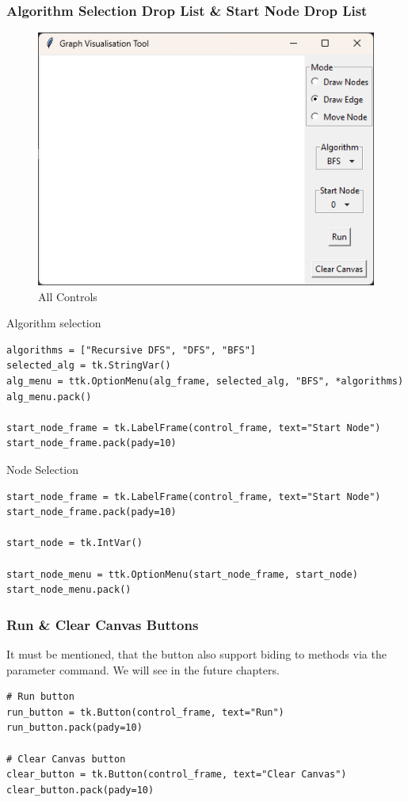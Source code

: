 \documentclass{article}
\begin{document}
\subsubsection{Algorithm Selection Drop List \& Start Node Drop List}

\begin{figure}[h]
    \centering
    \includegraphics[width=0.5\linewidth]{images/completed_control.png}
    \caption{All Controls}
    \label{fig:all_controls}
\end{figure}

Algorithm selection 
\begin{lstlisting}
algorithms = ["Recursive DFS", "DFS", "BFS"]
selected_alg = tk.StringVar()
alg_menu = ttk.OptionMenu(alg_frame, selected_alg, "BFS", *algorithms)
alg_menu.pack()

start_node_frame = tk.LabelFrame(control_frame, text="Start Node")
start_node_frame.pack(pady=10)
\end{lstlisting}

Node Selection
\begin{lstlisting}
start_node_frame = tk.LabelFrame(control_frame, text="Start Node")
start_node_frame.pack(pady=10)

start_node = tk.IntVar()

start_node_menu = ttk.OptionMenu(start_node_frame, start_node)
start_node_menu.pack()    
\end{lstlisting}
\subsubsection{Run \& Clear Canvas Buttons}
It must be mentioned, that the button also support biding to methods via the parameter command. We will see in the future chapters.

\begin{lstlisting}
# Run button
run_button = tk.Button(control_frame, text="Run")
run_button.pack(pady=10)

# Clear Canvas button
clear_button = tk.Button(control_frame, text="Clear Canvas")
clear_button.pack(pady=10)
\end{lstlisting}
\end{document}
